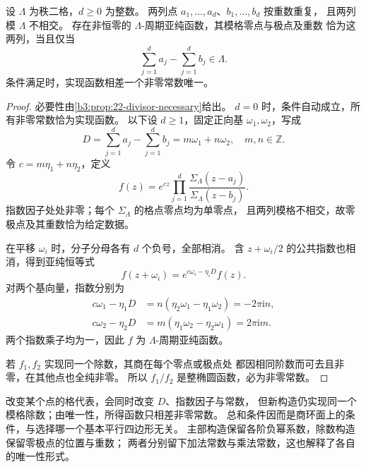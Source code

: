 \begin{theorem}[椭圆除数的实现]\label{b3:thm:22-divisor-realization}
设 \(\Lambda\) 为秩二格，\(d\ge0\) 为整数。
两列点 \(a_1,\ldots,a_d\)、\(b_1,\ldots,b_d\) 按重数重复，
且两列模 \(\Lambda\) 不相交。
存在非恒零的 \(\Lambda\)-周期亚纯函数，其模格零点与极点及重数
恰为这两列，当且仅当
\[
 \sum_{j=1}^d a_j-\sum_{j=1}^d b_j\in\Lambda.
\]
条件满足时，实现函数相差一个非零常数唯一。
\end{theorem}
\begin{proof}
必要性由\cref{b3:prop:22-divisor-necessary}给出。
\(d=0\) 时，条件自动成立，所有非零常数恰为实现函数。
以下设 \(d\ge1\)，固定正向基 \(\omega_1,\omega_2\)，写成
\[
 D=\sum_{j=1}^d a_j-\sum_{j=1}^d b_j
   =m\omega_1+n\omega_2,\quad m,n\in\mathbb Z.
\]
令 \(c=m\eta_1+n\eta_2\)，定义
\[
 f(z)=e^{cz}\prod_{j=1}^d
          \frac{\Sigma_\Lambda(z-a_j)}{\Sigma_\Lambda(z-b_j)}.
\]
指数因子处处非零；每个 \(\Sigma_\Lambda\) 的格点零点均为单零点，
且两列模格不相交，故零极点及其重数恰为给定数据。

在平移 \(\omega_i\) 时，分子分母各有 \(d\) 个负号，全部相消。
含 \(z+\omega_i/2\) 的公共指数也相消，得到亚纯恒等式
\[
 f(z+\omega_i)=e^{c\omega_i-\eta_iD}f(z).
\]
对两个基向量，指数分别为
\[
 \begin{aligned}
 c\omega_1-\eta_1D
 &=n(\eta_2\omega_1-\eta_1\omega_2)=-2\pi\mathrm i n,\\
 c\omega_2-\eta_2D
 &=m(\eta_1\omega_2-\eta_2\omega_1)=2\pi\mathrm i m.
 \end{aligned}
\]
两个指数乘子均为一，因此 \(f\) 为 \(\Lambda\)-周期亚纯函数。

若 \(f_1,f_2\) 实现同一个除数，其商在每个零点或极点处
都因相同阶数而可去且非零，在其他点也全纯非零。
所以 \(f_1/f_2\) 是整椭圆函数，必为非零常数。
\end{proof}

改变某个点的格代表，会同时改变 \(D\)、指数因子与常数，
但新构造仍实现同一个模格除数；由唯一性，所得函数只相差非零常数。
总和条件因而是商环面上的条件，与选择哪一个基本平行四边形无关。
主部构造保留各阶负幂系数，除数构造保留零极点的位置与重数；
两者分别留下加法常数与乘法常数，这也解释了各自的唯一性形式。
